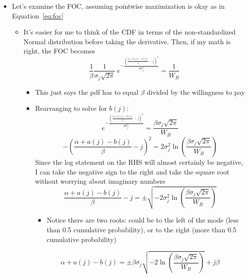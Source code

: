 \documentclass[12pt]{article}
\begin{document}
\begin{enumerate}
\begin{itemize}
\begin{itemize}
\begin{itemize}
\begin{itemize}
									\end{itemize}
						\end{itemize}
				\end{itemize}
			\item Let's examine the FOC, assuming pointwise maximization is okay as in Equation~\ref{eq:foc}
				\begin{itemize}
					\item It's easier for me to think of the CDF in terms of the non-standardized Normal distribution before taking the derivative. Then, if my math is right, the FOC becomes
						\begin{equation}
							  \frac{1}{\beta}\frac{1}{\sigma_j \sqrt{2\pi}} \: e^{- \frac{\left(\frac{\alpha + a(j) - b(j)}{\beta} - j\right)^2}{2\sigma_j^2} }= \frac{1}{W_B} 
								\label{eq:focB2}
						\end{equation}
							\begin{itemize}
								\item This just says the pdf has to equal $\beta$ divided by the willingness to pay
								\item Rearranging to solve for $b(j)$:
									\begin{equation}
							  		e^{- \frac{\left(\frac{\alpha + a(j) - b(j)}{\beta} - j\right)^2}{2\sigma_j^2} }= \frac{\beta\sigma_j \sqrt{2\pi}}{W_B} 
									\end{equation}
									\begin{equation}
							  		- \left(\frac{\alpha + a(j) - b(j)}{\beta} - j\right)^2 =2\sigma_j^2 \ln\left(\frac{\beta\sigma_j \sqrt{2\pi}}{W_B} \right)
									\end{equation}
								Since the log statement on the RHS will almost certainly be negative, I can take the negative sign to the right and take the square root without worrying about imaginary numbers
								  \begin{equation}
							  		\frac{\alpha + a(j) - b(j)}{\beta} - j = \pm \sqrt{-2\sigma_j^2 \ln\left(\frac{\beta\sigma_j \sqrt{2\pi}}{W_B} \right)}
									\end{equation}
										\begin{itemize}
											\item Notice there are two roots: could be to the left of the mode (less than 0.5 cumulative probability), or to the right (more than 0.5 cumulative probability)
										\end{itemize}
									\begin{equation}
							  		\alpha + a(j) - b(j) = \pm \beta\sigma_j \sqrt{-2 \ln\left(\frac{\beta\sigma_j \sqrt{2\pi}}{W_B} \right)} + j \beta

\end{equation}
\end{itemize}
\end{itemize}
\end{itemize}
\end{enumerate}
\end{document}
